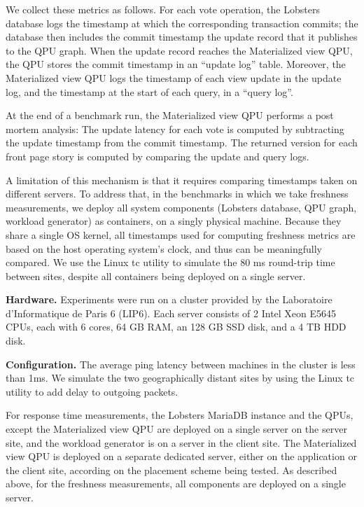 We collect these metrics as follows.
For each vote operation, the Lobsters database logs the timestamp at which the corresponding transaction commits;
the database then includes the commit timestamp the update record that it publishes to the QPU graph.
When the update record reaches the Materialized view QPU, the QPU stores the commit timestamp in an
``update log'' table.
Moreover, the Materialized view QPU logs the timestamp of each view update in the update log,
and the timestamp at the start of each query, in a ``query log''.

At the end of a benchmark run, the Materialized view QPU performs a post mortem analysis:
The update latency for each vote is computed by subtracting the update timestamp from the commit timestamp.
The returned version for each front page story is computed by comparing the update and query logs.

A limitation of this mechanism is that it requires comparing timestamps taken on different servers.
To address that, in the benchmarks in which we take freshness measurements,
we deploy all system components (Lobsters database, QPU graph, workload generator) as containers,
on a singly physical machine.
Because they share a single OS kernel, all timestamps used for computing freshness metrics are based
on the host operating system's clock, and thus can be meaningfully compared.
We use the Linux tc utility \cite{tc} to simulate the 80 ms round-trip time between sites,
despite all containers being deployed on a single server.

\bigskip
\noindent
\textbf{Hardware.}
Experiments were run on a cluster provided by the Laboratoire d'Informatique de Paris 6 (LIP6).
Each server consists of 2 Intel Xeon E5645 CPUs, each with 6 cores, 64 GB RAM, an 128 GB SSD disk, and a 4 TB HDD disk.

\bigskip
\noindent
\textbf{Configuration.}
The average ping latency between machines in the cluster is less than 1ms.
We simulate the two geographically distant sites by using the Linux tc utility \cite{tc} to add delay to outgoing packets.

For response time measurements, the Lobsters MariaDB instance and the QPUs, except the Materialized view QPU are deployed
on a single server on the server site, and the workload generator is on a server in the client site.
The Materialized view QPU is deployed on a separate dedicated server, either on the application or the client site,
according on the placement scheme being tested.
As described above, for the freshness measurements, all components are deployed on a single server.

